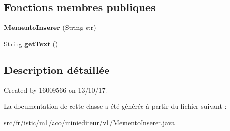 \subsection*{Fonctions membres publiques}
\begin{DoxyCompactItemize}
\item 
\mbox{\label{classfr_1_1istic_1_1m1_1_1aco_1_1miniediteur_1_1v1_1_1MementoInserer_a0d639b4f1974085e017b86c98a95ccfc}} 
{\bfseries Memento\+Inserer} (String str)
\item 
\mbox{\label{classfr_1_1istic_1_1m1_1_1aco_1_1miniediteur_1_1v1_1_1MementoInserer_a9aefd3489567d9cdcdb81236d1f99408}} 
String {\bfseries get\+Text} ()
\end{DoxyCompactItemize}


\subsection{Description détaillée}
Created by 16009566 on 13/10/17. 

La documentation de cette classe a été générée à partir du fichier suivant \+:\begin{DoxyCompactItemize}
\item 
src/fr/istic/m1/aco/miniediteur/v1/Memento\+Inserer.\+java\end{DoxyCompactItemize}
